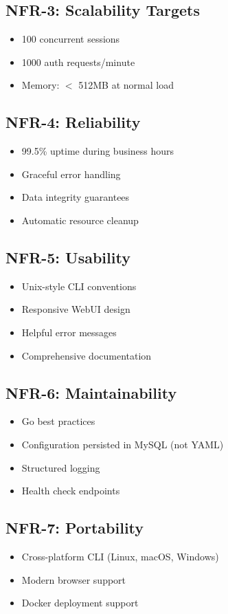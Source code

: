 \subsection{NFR-3: Scalability Targets}
\begin{itemize}
    \item 100 concurrent sessions
    \item 1000 auth requests/minute
    \item Memory: $<$ 512MB at normal load
\end{itemize}

\subsection{NFR-4: Reliability}
\begin{itemize}
    \item 99.5\% uptime during business hours
    \item Graceful error handling
    \item Data integrity guarantees
    \item Automatic resource cleanup
\end{itemize}

\subsection{NFR-5: Usability}
\begin{itemize}
    \item Unix-style CLI conventions
    \item Responsive WebUI design
    \item Helpful error messages
    \item Comprehensive documentation
\end{itemize}

\subsection{NFR-6: Maintainability}
\begin{itemize}
    \item Go best practices
    \item Configuration persisted in MySQL (not YAML)
    \item Structured logging
    \item Health check endpoints
\end{itemize}

\subsection{NFR-7: Portability}
\begin{itemize}
    \item Cross-platform CLI (Linux, macOS, Windows)
    \item Modern browser support
    \item Docker deployment support
\end{itemize}

